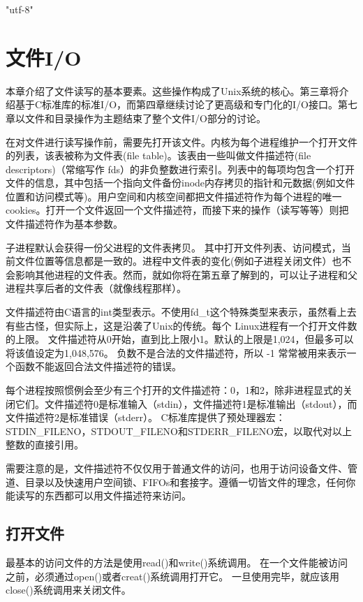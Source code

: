 \ifx\atempxetex\usewhat
\XeTeXinputencoding "utf-8"
\fi
{}

\chapter{文件I/O}

本章介绍了文件读写的基本要素。这些操作构成了Unix系统的核心。第三章将介绍基于C标准库的标准I/O，而第四章继续讨论了更高级和专门化的I/O接口。第七章以文件和目录操作为主题结束了整个文件I/O部分的讨论。

在对文件进行读写操作前，需要先打开该文件。内核为每个进程维护一个打开文件的列表，该表被称为文件表(file table)。该表由一些叫做文件描述符(file descriptors)（常缩写作 fds）的非负整数进行索引。列表中的每项均包含一个打开文件的信息，其中包括一个指向文件备份inode内存拷贝的指针和元数据(例如文件位置和访问模式等)。用户空间和内核空间都把文件描述符作为每个进程的唯一cookies。打开一个文件返回一个文件描述符，而接下来的操作（读写等等）则把文件描述符作为基本参数。

子进程默认会获得一份父进程的文件表拷贝。 其中打开文件列表、访问模式，当前文件位置等信息都是一致的。进程中文件表的变化(例如子进程关闭文件）也不会影响其他进程的文件表。然而，就如你将在第五章了解到的，可以让子进程和父进程共享后者的文件表（就像线程那样）。

文件描述符由C语言的int类型表示。不使用fd\_t这个特殊类型来表示，虽然看上去有些古怪，但实际上，这是沿袭了Unix的传统。每个 Linux进程有一个打开文件数的上限。 文件描述符从0开始，直到比上限小1。默认的上限是1,024，但最多可以将该值设定为1,048,576。 负数不是合法的文件描述符，所以 -1 常常被用来表示一个函数不能返回合法文件描述符的错误。

每个进程按照惯例会至少有三个打开的文件描述符：0，1和2，除非进程显式的关闭它们。文件描述符0是标准输入（stdin），文件描述符1是标准输出（stdout），而文件描述符2是标准错误（stderr）。 C标准库提供了预处理器宏：STDIN\_FILENO，STDOUT\_FILENO和STDERR\_FILENO宏，以取代对以上整数的直接引用。

需要注意的是，文件描述符不仅仅用于普通文件的访问，也用于访问设备文件、管道、目录以及快速用户空间锁、FIFOs和套接字。遵循一切皆文件的理念，任何你能读写的东西都可以用文件描述符来访问。 

\section{打开文件}
最基本的访问文件的方法是使用read()和write()系统调用。 在一个文件能被访问之前，必须通过open()或者creat()系统调用打开它。 一旦使用完毕，就应该用close()系统调用来关闭文件。 

